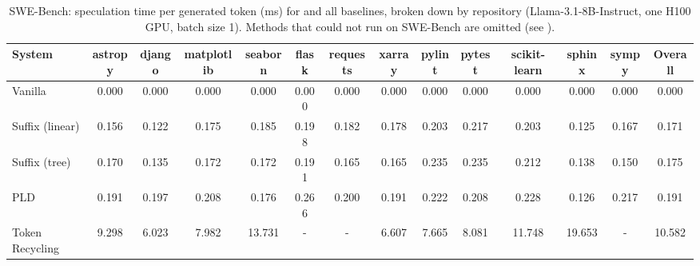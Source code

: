\begin{table}[htbp]
\centering
\caption{SWE-Bench: speculation time per generated token (ms) for \SuffixDecoding and all baselines, broken down by repository (Llama-3.1-8B-Instruct, one H100 GPU, batch size 1). Methods that could not run on SWE-Bench are omitted (see ).}
\label{suffixdecoding:tab:swe-spectime}
\small
\begin{adjustbox}{width=\linewidth}
\begin{tabular}{lccccccccccccc}
\toprule
\textbf{System} & astropy & django & matplotlib & seaborn & flask & requests & xarray & pylint & pytest & scikit-learn & sphinx & sympy & \textbf{Overall} \\
\midrule
Vanilla & 0.000 & 0.000 & 0.000 & 0.000 & 0.000 & 0.000 & 0.000 & 0.000 & 0.000 & 0.000 & 0.000 & 0.000 & 0.000 \\
Suffix (linear) & 0.156 & 0.122 & 0.175 & 0.185 & 0.198 & 0.182 & 0.178 & 0.203 & 0.217 & 0.203 & 0.125 & 0.167 & 0.171 \\
Suffix (tree) & 0.170 & 0.135 & 0.172 & 0.172 & 0.191 & 0.165 & 0.165 & 0.235 & 0.235 & 0.212 & 0.138 & 0.150 & 0.175 \\
PLD & 0.191 & 0.197 & 0.208 & 0.176 & 0.266 & 0.200 & 0.191 & 0.222 & 0.208 & 0.228 & 0.126 & 0.217 & 0.191 \\
Token Recycling & 9.298 & 6.023 & 7.982 & 13.731 & - & - & 6.607 & 7.665 & 8.081 & 11.748 & 19.653 & - & 10.582 \\
\bottomrule
\end{tabular}
\end{adjustbox}
\end{table}

